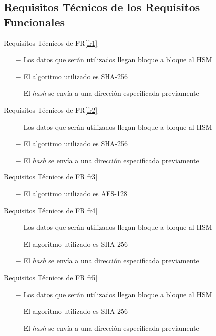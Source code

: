 \documentclass{article}
\begin{document}
  \subsection{Requisitos Técnicos de los Requisitos Funcionales}
  
    \begin{technical}
      \techrequirement
            {Requisitos Técnicos de FR\ref{fr1}}
            {
      \begin{itemize}
        \item[$-$]{Los datos que serán utilizados llegan bloque a bloque al HSM}
        \item[$-$]{El algoritmo utilizado es SHA-256}
                \item[$-$]{El \textit{hash} se envía a una dirección especificada previamente}
      \end{itemize}
      }
            
      \techrequirement
            {Requisitos Técnicos de FR\ref{fr2}}
      {
      \begin{itemize}
        \item[$-$]{Los datos que serán utilizados llegan bloque a bloque al HSM}
        \item[$-$]{El algoritmo utilizado es SHA-256}
                \item[$-$]{El \textit{hash} se envía a una dirección especificada previamente}
      \end{itemize}
      }
            
            \techrequirement
            {Requisitos Técnicos de FR\ref{fr3}}
      {
      \begin{itemize}
        \item[$-$]{El algoritmo utilizado es AES-128}
      \end{itemize}
      }
            
            \techrequirement
            {Requisitos Técnicos de FR\ref{fr4}}
      {
      \begin{itemize}
        \item[$-$]{Los datos que serán utilizados llegan bloque a bloque al HSM}
        \item[$-$]{El algoritmo utilizado es SHA-256}
                \item[$-$]{El \textit{hash} se envía a una dirección especificada previamente}
      \end{itemize}
      }
            
            \techrequirement
            {Requisitos Técnicos de FR\ref{fr5}}
      {
      \begin{itemize}
        \item[$-$]{Los datos que serán utilizados llegan bloque a bloque al HSM}
        \item[$-$]{El algoritmo utilizado es SHA-256}
                \item[$-$]{El \textit{hash} se envía a una dirección especificada previamente}
      \end{itemize}
      }
            

\end{technical}
\end{document}
